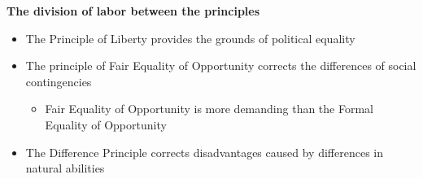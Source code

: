 \textbf{The division of labor between the principles}
\begin{itemize}
	\item The Principle of Liberty provides the grounds of political
	equality
	\item The principle of Fair Equality of Opportunity corrects the
	differences of social contingencies
	\begin{itemize}
		\item Fair Equality of Opportunity is more demanding than the
		Formal Equality of Opportunity
	\end{itemize}
	\item The Difference Principle corrects disadvantages caused by
	differences in natural abilities
\end{itemize}
